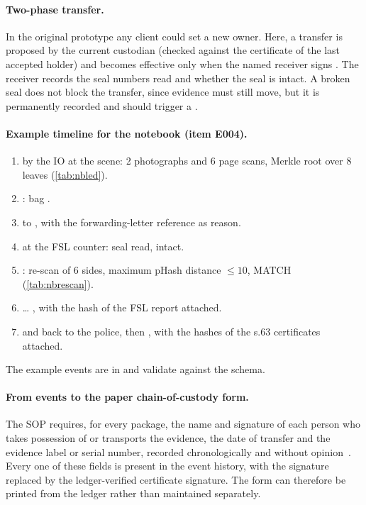 \paragraph{Two-phase transfer.} In the original prototype any client could set a new owner. Here, a transfer is proposed by the current custodian (checked against the certificate of the last accepted holder) and becomes effective only when the named receiver signs . The receiver records the seal numbers read and whether the seal is intact. A broken seal does not block the transfer, since evidence must still move, but it is permanently recorded and should trigger a .

\paragraph{Example timeline for the notebook (item E004).}
\begin{enumerate}[nosep]
  \item {} by the IO at the scene: 2 photographs and 6 page scans, Merkle root over 8 leaves (\cref{tab:nbled}).
  \item {}: bag .
  \item {} to , with the forwarding-letter reference as reason.
  \item {} at the FSL counter: seal read, intact.
  \item {}: re-scan of 6 sides, maximum pHash distance \NbRescanMaxDist{} $\le 10$, MATCH (\cref{tab:nbrescan}).
  \item {} \ldots{} , with the hash of the FSL report attached.
  \item {} and  back to the police, then , with the hashes of the s.63 certificates attached.
\end{enumerate}
The example events are in  and validate against the schema.

\paragraph{From events to the paper chain-of-custody form.} The SOP requires, for every package, the name and signature of each person who takes possession of or transports the evidence, the date of transfer and the evidence label or serial number, recorded chronologically and without opinion~\cite{sopbnss}. Every one of these fields is present in the event history, with the signature replaced by the ledger-verified certificate signature. The form can therefore be printed from the ledger rather than maintained separately.

